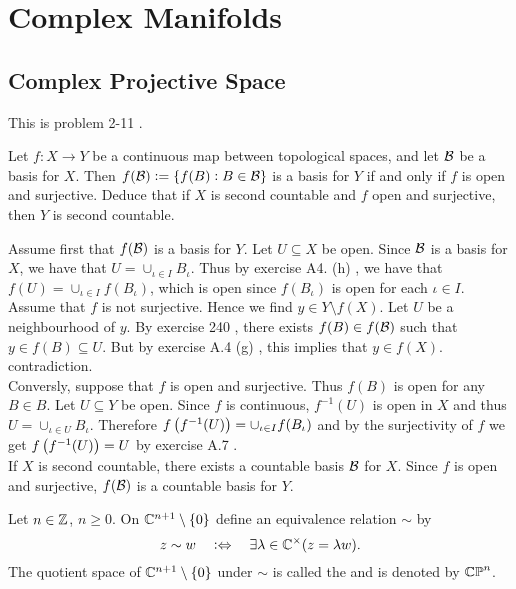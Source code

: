 \chapter{Complex Manifolds}
\section{Complex Projective Space}

This is problem 2-11 \cite{lee:topological_manifolds:2011}.

\begin{exercise}
Let $f : X \to Y$ be a continuous map between topological spaces, and let $\mathcal{B}$ be a basis for $X$. Then $f(\Bcal) := \cbr[0]{f(B) : B \in \Bcal}$ is a basis for $Y$ if and only if $f$ is open and surjective. Deduce that if $X$ is second countable and $f$ open and surjective, then $Y$ is second countable. 
\label{ex:2-11}
\end{exercise}

\begin{solution}
Assume first that $f(\mathcal{B})$ is a basis for $Y$. Let $U \subseteq X$ be open. Since $\mathcal{B}$ is a basis for $X$, we have that $U = \cup_{\iota \in I} B_\iota$. Thus by exercise A4. (h) \cite[388]{lee:topological_manifolds:2011}, we have that $f(U) = \cup_{\iota \in I}f(B_\iota)$, which is open since $f(B_\iota)$ is open for each $\iota \in I$. Assume that $f$ is not surjective. Hence we find $y \in Y \setminus f(X)$. Let $U$ be a neighbourhood of $y$. By exercise 240 \cite[33]{lee:topological_manifolds:2011}, there exists $f(B) \in f(\mathcal{B})$ such that $y \in f(B) \subseteq U$. But by exercise A.4 (g) \cite[388]{lee:topological_manifolds:2011}, this implies that $y \in f(X)$. contradiction.\\
Conversly, suppose that $f$ is open and surjective. Thus $f(B)$ is open for any $B \in B$. Let $U \subseteq Y$ be open. Since $f$ is continuous, $f^{-1}(U)$ is open in $X$ and thus $U = \cup_{\iota \in U} B_\iota$. Therefore $f\del[1]{f^{-1}(U)} = \cup_{\iota \in I}f(B_\iota)$ and by the surjectivity of $f$ we get $f\del[1]{f^{-1}(U)} = U$ by exercise A.7 \cite[388]{lee:topological_manifolds:2011}.\\
If $X$ is second countable, there exists a countable basis $\mathcal{B}$ for $X$. Since $f$ is open and surjective, $f(\mathcal{B})$ is a countable basis for $Y$.
\end{solution}

\begin{definition}
Let $n \in \mathbb{Z}$, $n \geq 0$. On $\Cbb^{n + 1}\setminus \cbr[0]{0}$ define an equivalence relation $\sim$ by 
\begin{equation}
z \sim w \quad : \Leftrightarrow \quad \exists \lambda \in \mathbb{C}^\times (z = \lambda w).
\end{equation}
The quotient space of $\Cbb^{n + 1}\setminus \cbr[0]{0}$ under $\sim$ is called the  and is denoted by $\mathbb{CP}^n$.
\end{definition}

